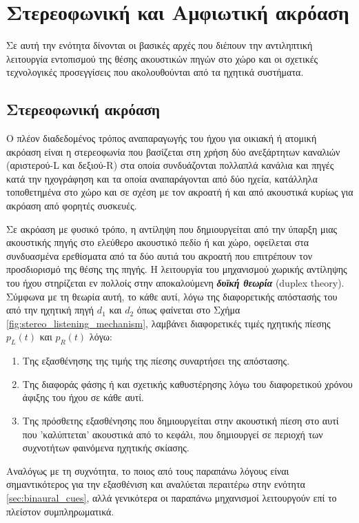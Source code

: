 \section{Στερεοφωνική και Αμφιωτική ακρόαση}

Σε αυτή την ενότητα δίνονται οι βασικές αρχές που διέπουν την αντιληπτική λειτουργία εντοπισμού της θέσης ακουστικών πηγών στο χώρο και οι σχετικές τεχνολογικές προσεγγίσεις που ακολουθούνται από τα ηχητικά συστήματα.

\subsection{Στερεοφωνική ακρόαση}

Ο πλέον διαδεδομένος τρόπος αναπαραγωγής του ήχου για οικιακή ή ατομική ακρόαση είναι η στερεοφωνία που βασίζεται στη χρήση δύο ανεξάρτητων καναλιών (αριστερού-L και δεξιού-R) στα οποία συνδυάζονται πολλαπλά κανάλια και πηγές κατά την ηχογράφηση και τα οποία αναπαράγονται από δύο ηχεία, κατάλληλα τοποθετημένα στο χώρο και σε σχέση με τον ακροατή ή και από ακουστικά κυρίως για ακρόαση από φορητές συσκευές.

Σε ακρόαση με φυσικό τρόπο, η αντίληψη που δημιουργείται από την ύπαρξη μιας ακουστικής πηγής στο ελεύθερο ακουστικό πεδίο ή και χώρο, οφείλεται στα συνδυασμένα ερεθίσματα από τα δύο αυτιά του ακροατή που επιτρέπουν τον προσδιορισμό της θέσης της πηγής. Η λειτουργία του μηχανισμού χωρικής αντίληψης του ήχου στηρίζεται εν πολλοίς στην αποκαλούμενη \textit{\textbf{δυϊκή θεωρία}} (duplex theory). Σύμφωνα με τη θεωρία αυτή, το κάθε αυτί, λόγω της διαφορετικής απόστασής του από την ηχητική πηγή $d_1$ και $d_2$ όπως φαίνεται στο Σχήμα \ref{fig:stereo_listening_mechanism}, λαμβάνει διαφορετικές τιμές ηχητικής πίεσης $p_L(t)$ και $p_R(t)$ λόγω:
\begin{enumerate}
    \item Της εξασθένησης της τιμής της πίεσης συναρτήσει της απόστασης.
    \item Της διαφοράς φάσης ή και σχετικής καθυστέρησης λόγω του διαφορετικού χρόνου άφιξης του ήχου σε κάθε αυτί.
    \item Της πρόσθετης εξασθένησης που δημιουργείται στην ακουστική πίεση στο αυτί που 'καλύπτεται' ακουστικά από το κεφάλι, που δημιουργεί σε περιοχή των συχνοτήτων φαινόμενα ηχητικής σκίασης.
\end{enumerate}{}

Αναλόγως με τη συχνότητα, το ποιος από τους παραπάνω λόγους είναι σημαντικότερος για την εξασθένιση και αναλύεται περαιτέρω στην ενότητα \ref{sec:binaural_cues}, αλλά γενικότερα οι παραπάνω μηχανισμοί λειτουργούν επί το πλείστον συμπληρωματικά.

